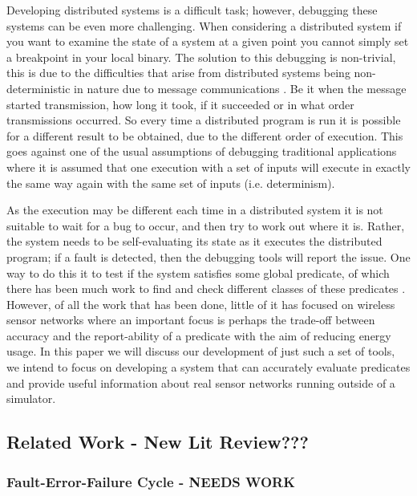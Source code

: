 Developing distributed systems is a difficult task; however, debugging these systems can be even more challenging\cite{345131}. When considering a distributed system if you want to examine the state of a system at a given point you cannot simply set a breakpoint in your local binary. The solution to this debugging is non-trivial, this is due to the difficulties that arise from distributed systems being non-deterministic in nature due to message communications \cite{1676929,Joyce:1987:MDS:13677.22723,Fagerstrom:1988:DTD:55823.55833}. Be it when the message started transmission, how long it took, if it succeeded or in what order transmissions occurred. So every time a distributed program is run it is possible for a different result to be obtained, due to the different order of execution. This goes against one of the usual assumptions of debugging traditional applications where it is assumed that one execution with a set of inputs will execute in exactly the same way again with the same set of inputs\cite{?} (i.e. determinism).

As the execution may be different each time in a distributed system it is not suitable to wait for a bug to occur, and then try to work out where it is. Rather, the system needs to be self-evaluating its state as it executes the distributed program; if a fault is detected, then the debugging tools will report the issue. One way to do this it to test if the system satisfies some global predicate, of which there has been much work to find and check different classes of these predicates \cite{553309,345831,277788}. However, of all the work that has been done, little of it has focused on wireless sensor networks where an important focus is perhaps the trade-off between accuracy and the report-ability of a predicate with the aim of reducing energy usage. In this paper we will discuss our development of just such a set of tools, we intend to focus on developing a system that can accurately evaluate predicates and provide useful information about real sensor networks running outside of a simulator.

\subsection{Related Work - New Lit Review???}

\subsubsection*{Fault-Error-Failure Cycle - NEEDS WORK}

